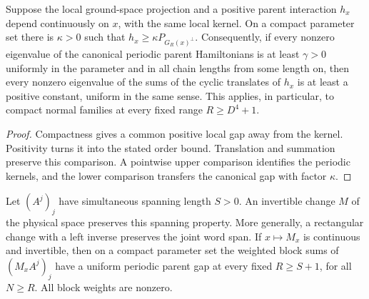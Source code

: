 \begin{lemma}
    \label{thm:compact_positive_parent_interaction_gap}
    \leanok
    Suppose the local ground-space projection and a positive parent
    interaction $h_x$ depend continuously on $x$, with the same local
    kernel. On a compact parameter set there is $\kappa>0$ such that
    $h_x\geq\kappa P_{G_R(x)^\perp}$. Consequently, if every nonzero
    eigenvalue of the canonical periodic parent Hamiltonians is at least
    $\gamma>0$ uniformly in the parameter and in all chain lengths from some
    length on,
    then every nonzero eigenvalue of the sums of the cyclic translates of
    $h_x$ is at least a positive constant, uniform in the same sense.
    This applies, in particular, to compact
    normal families at every fixed range $R\geq D^4+1$.
\end{lemma}

\begin{proof}
    \leanok
    Compactness gives a common positive local gap away from the kernel.
    Positivity turns it into the stated order bound. Translation and
    summation preserve this comparison. A pointwise upper comparison
    identifies the periodic kernels, and the lower comparison transfers
    the canonical gap with factor $\kappa$.
\end{proof}


\begin{lemma}
    \label{thm:physical_action_joint_span_compact_gap}
    \leanok
    Let $(A^j)_j$ have simultaneous spanning length $S>0$. An invertible
    change $M$ of the physical space preserves this spanning property.
    More generally, a rectangular change with a left inverse preserves
    the joint word span. If $x\mapsto M_x$ is continuous and invertible,
    then on a compact parameter set the weighted block sums of
    $(M_xA^j)_j$ have a uniform periodic parent gap at every fixed
    $R\geq S+1$, for all $N\geq R$. All block weights are nonzero.
\end{lemma}

